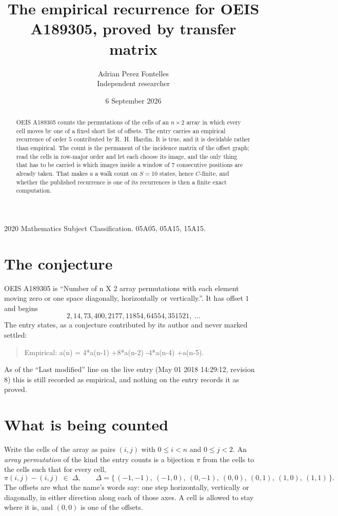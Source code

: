 \documentclass[11pt,a4paper]{article}
\title{The empirical recurrence for OEIS A189305, proved by transfer matrix}
\author{Adrian Perez Fontelles\\ \small Independent researcher}
\date{6 September 2026}
\theoremstyle{plain}
\theoremstyle{definition}
\begin{document}
\maketitle

\begin{abstract}
OEIS A189305 counts the permutations of the cells of an $n\times2$ array in which every cell
moves by one of a fixed short list of offsets. The entry carries an empirical recurrence of
order $5$ contributed by R.~H.~Hardin. It is true, and it is decidable rather than
empirical. The count is the permanent of the incidence matrix of the offset graph; read the
cells in row-major order and let each choose its image, and the only thing that has to be
carried is which images inside a window of $7$ consecutive positions are already taken.
That makes $a$ a walk count on $S=10$ states, hence $C$-finite, and whether the published
recurrence is one of its recurrences is then a finite exact computation.
\end{abstract}

\noindent\small 2020 Mathematics Subject Classification. 05A05, 05A15, 15A15.\normalsize

\section{The conjecture}

OEIS A189305 is ``Number of n X 2 array permutations with each element moving zero or one space diagonally, horizontally or vertically.''. It has offset $1$ and begins
\[
2, 14, 73, 400, 2177, 11854, 64554, 351521,\ \dots
\]
The entry states, as a conjecture contributed by its author and never marked settled:
\begin{quote}
Empirical: a(n) = 4*a(n-1) +8*a(n-2) -4*a(n-4) +a(n-5).
\end{quote}
As of the ``Last modified'' line on the live entry (May 01 2018 14:29:12, revision 8) this is still
recorded as empirical, and nothing on the entry records it as proved.

\section{What is being counted}

Write the cells of the array as pairs $(i,j)$ with $0\le i<n$ and $0\le j<2$. An
\emph{array permutation} of the kind the entry counts is a bijection $\pi$ from the cells to
the cells such that for every cell,
\[
\pi(i,j)-(i,j)\;\in\;\Delta,\qquad
\Delta=\{\,(-1,-1),\ (-1,0),\ (0,-1),\ (0,0),\ (0,1),\ (1,0),\ (1,1)\,\}.
\]
The offsets are what the name's words say: one step horizontally, vertically or diagonally, in either direction along each of those axes. A cell is allowed to stay where it is, and $(0,0)$ is one of the offsets.
\end{document}

